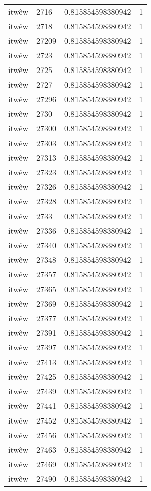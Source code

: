 \begin{longtable}{llll}
itwêw & 2716 & 0.815854598380942 & 1 \\
itwêw & 2718 & 0.815854598380942 & 1 \\
itwêw & 27209 & 0.815854598380942 & 1 \\
itwêw & 2723 & 0.815854598380942 & 1 \\
itwêw & 2725 & 0.815854598380942 & 1 \\
itwêw & 2727 & 0.815854598380942 & 1 \\
itwêw & 27296 & 0.815854598380942 & 1 \\
itwêw & 2730 & 0.815854598380942 & 1 \\
itwêw & 27300 & 0.815854598380942 & 1 \\
itwêw & 27303 & 0.815854598380942 & 1 \\
itwêw & 27313 & 0.815854598380942 & 1 \\
itwêw & 27323 & 0.815854598380942 & 1 \\
itwêw & 27326 & 0.815854598380942 & 1 \\
itwêw & 27328 & 0.815854598380942 & 1 \\
itwêw & 2733 & 0.815854598380942 & 1 \\
itwêw & 27336 & 0.815854598380942 & 1 \\
itwêw & 27340 & 0.815854598380942 & 1 \\
itwêw & 27348 & 0.815854598380942 & 1 \\
itwêw & 27357 & 0.815854598380942 & 1 \\
itwêw & 27365 & 0.815854598380942 & 1 \\
itwêw & 27369 & 0.815854598380942 & 1 \\
itwêw & 27377 & 0.815854598380942 & 1 \\
itwêw & 27391 & 0.815854598380942 & 1 \\
itwêw & 27397 & 0.815854598380942 & 1 \\
itwêw & 27413 & 0.815854598380942 & 1 \\
itwêw & 27425 & 0.815854598380942 & 1 \\
itwêw & 27439 & 0.815854598380942 & 1 \\
itwêw & 27441 & 0.815854598380942 & 1 \\
itwêw & 27452 & 0.815854598380942 & 1 \\
itwêw & 27456 & 0.815854598380942 & 1 \\
itwêw & 27463 & 0.815854598380942 & 1 \\
itwêw & 27469 & 0.815854598380942 & 1 \\
itwêw & 27490 & 0.815854598380942 & 1 \\

\end{longtable}
